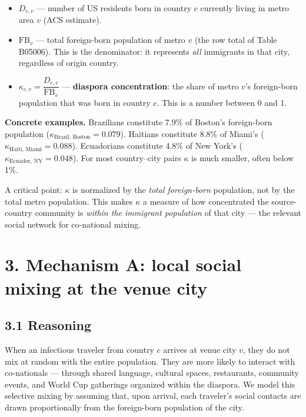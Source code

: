 \documentclass[11pt]{article}
\begin{document}
\begin{itemize}
  \item $D_{c,v}$ --- number of US residents born in country $c$ currently
    living in metro area $v$ (ACS estimate).
  \item $\mathrm{FB}_{v}$ --- total foreign-born population of metro $v$
    (the row total of Table B05006). This is the denominator: it represents
    \emph{all} immigrants in that city, regardless of origin country.
  \item $\kappa_{c,v} = \dfrac{D_{c,v}}{\mathrm{FB}_{v}}$ ---
    \textbf{diaspora concentration}: the share of metro $v$'s
    foreign-born population that was born in country $c$. This is a
    number between 0 and 1.
\end{itemize}

\medskip
\noindent\textbf{Concrete examples.}
Brazilians constitute 7.9\% of Boston's foreign-born population
($\kappa_{\text{Brazil, Boston}} = 0.079$). Haitians constitute 8.8\%
of Miami's ($\kappa_{\text{Haiti, Miami}} = 0.088$). Ecuadorians
constitute 4.8\% of New York's ($\kappa_{\text{Ecuador, NY}} = 0.048$).
For most country--city pairs $\kappa$ is much smaller, often below 1\%.

A critical point: $\kappa$ is normalized by the \emph{total foreign-born}
population, not by the total metro population. This makes $\kappa$ a
measure of how concentrated the source-country community is
\emph{within the immigrant population} of that city --- the relevant
social network for co-national mixing.

\section*{3. Mechanism A: local social mixing at the venue city}

\subsection*{3.1 Reasoning}

When an infectious traveler from country $c$ arrives at venue city $v$,
they do not mix at random with the entire population. They are more
likely to interact with co-nationals --- through shared language, cultural
spaces, restaurants, community events, and World Cup gatherings organized
within the diaspora. We model this selective mixing by assuming that, upon
arrival, each traveler's social contacts are drawn proportionally from the
foreign-born population of the city.
\end{document}
